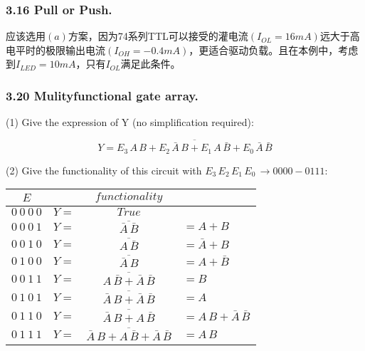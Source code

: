     \subsubsection{3.16 \textnormal{Pull or Push}.}
    {\color{hwSolution}
        应该选用$(a)$方案，因为74系列TTL可以接受的灌电流$(I_{OL}=16mA)$远大于高电平时的极限输出电流$(I_{OH}=-0.4mA)$，更适合驱动负载。且在本例中，考虑到$I_{LED}=10mA$，只有$I_{OL}$满足此条件。
    }
    
    \subsubsection{3.20 \textnormal{Mulityfunctional gate array}.}

    (1) Give the expression of Y (no simplification required):

    {\color{hwSolution}
        \[
            Y = \overline{E_3\,A\,B + E_2\,\bar{A}\,B + E_1\,A\,\bar{B} + E_0\,\bar{A}\,\bar{B}}
        \]
    }

    (2) Give the functionality of this circuit with $E_3\,E_2\,E_1\,E_0\,\rightarrow 0000 - 0111$:

    {\color{hwSolution}
        \begin{center}
            \begin{tabular}{c|l c l}
                $E$    & & $functionality$ & \\
                \hline
                $0~0~0~0$ & $Y = $ & $ True$ & 
                            \\
                $0~0~0~1$ & $Y = $ & $ \overline{\bar{A}\,\bar{B}}$ & 
                            $ = A + B$\\
                $0~0~1~0$ & $Y = $ & $ \overline{A\,\bar{B}} $ & 
                            $ = \bar{A} + B$\\
                $0~1~0~0$ & $Y = $ & $ \overline{\bar{A}\,B} $ & 
                            $ = A + \bar{B}$\\
                $0~0~1~1$ & $Y = $ & $ \overline{A\,\bar{B} + \bar{A}\,\bar{B}}$ & 
                            $ = B$\\
                $0~1~0~1$ & $Y = $ & $ \overline{\bar{A}\,B + \bar{A}\,\bar{B}}$ & 
                            $ = A$\\
                $0~1~1~0$ & $Y = $ & $ \overline{\bar{A}\,B + A\,\bar{B}}$ & 
                            $ = A\,B + \bar{A}\,\bar{B}$\\
                $0~1~1~1$ & $Y = $ & $ \overline{\bar{A}\,B + A\,\bar{B} + \bar{A}\,\bar{B}}$& 
                            $ = A\,B$\\
            \end{tabular}
        \end{center}
    }

